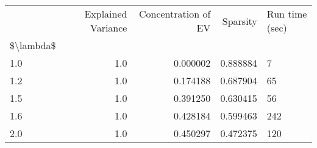 \begin{tabular}{lrrrl}
\toprule
{} &  Explained Variance &  Concentration of EV &  Sparsity & Run time (sec) \\
\$\textbackslash lambda\$ &                     &                      &           &                \\
\midrule
1.0       &                 1.0 &             0.000002 &  0.888884 &              7 \\
1.2       &                 1.0 &             0.174188 &  0.687904 &             65 \\
1.5       &                 1.0 &             0.391250 &  0.630415 &             56 \\
1.6       &                 1.0 &             0.428184 &  0.599463 &            242 \\
2.0       &                 1.0 &             0.450297 &  0.472375 &            120 \\
\bottomrule
\end{tabular}
